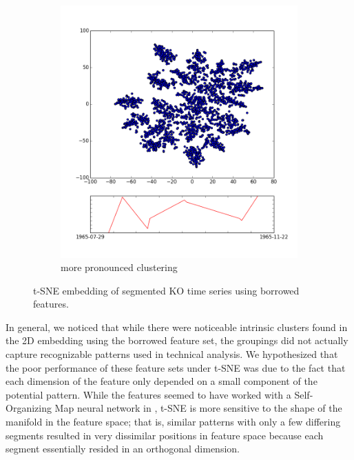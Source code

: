 \documentclass{article} %
\begin{document}
\begin{figure}[h]
\begin{center}
\begin{subfigure}[b]{0.49\textwidth}
        		\includegraphics[width=1\textwidth]{ko-10-10-scatter.png}
                \caption{more pronounced clustering}
                \label{fig:ko1010}
        \end{subfigure}
\end{center}
\caption{t-SNE embedding of segmented KO time series using borrowed features.}
\end{figure}
In general, we noticed that while there were noticeable intrinsic clusters found in the 2D embedding using the borrowed feature set, the groupings did not actually capture recognizable patterns used in technical analysis. We hypothesized that the poor performance of these feature sets under t-SNE was due to the fact that each dimension of the feature only depended on a small component of the potential pattern. While the features seemed to have worked with a Self-Organizing Map neural network in \cite{Guo07recognizingstock}, t-SNE is more sensitive to the shape of the manifold in the feature space; that is, similar patterns with only a few differing segments resulted in very dissimilar positions in feature space because each segment essentially resided in an orthogonal dimension.
\end{document}
